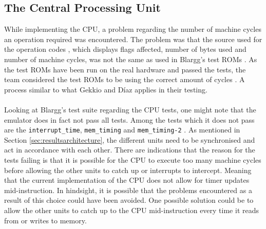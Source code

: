 \subsection{The Central Processing Unit}
\label{sec:CPUDiscussion}
While implementing the CPU, a problem regarding the number of machine cycles an operation required was encountered. The problem was that the source used for the operation codes \cite{OpCodes}, which displays flags affected, number of bytes used and number of machine cycles, was not the same as used in Blargg's test ROMs \cite{Blargg}. As the test ROMs have been run on the real hardware and passed the tests, the team considered the test ROMs to be using the correct amount of cycles \cite{TestROMsResult}. A process similar to what Gekkio and Díaz applies in their testing.
\\\\
Looking at Blargg's test suite regarding the CPU tests, one might note that the emulator does in fact not pass all tests. Among the tests which it does not pass are the \texttt{interrupt\_time}, \texttt{mem\_timing} and \texttt{mem\_timing-2} \cite{Blargg}. As mentioned in Section \ref{sec:resultsarchitecture}, the different units need to be synchronised and act in accordance with each other. There are indications that the reason for the tests failing is that it is possible for the CPU to execute too many machine cycles before allowing the other units to catch up or interrupts to intercept. Meaning that the current implementation of the CPU does not allow for timer updates mid-instruction. In hindsight, it is possible that the problems encountered as a result of this choice could have been avoided. One possible solution could be to allow the other units to catch up to the CPU mid-instruction every time it reads from or writes to memory.
\\

